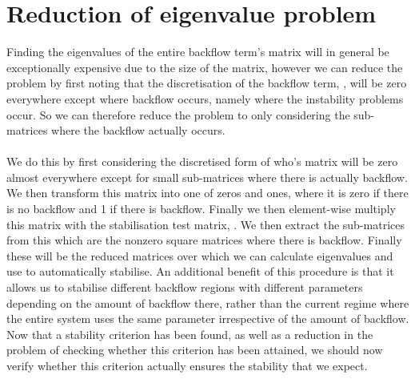 \section{Reduction of eigenvalue problem}

Finding the eigenvalues of the entire backflow term's matrix will in general be exceptionally expensive due to the size of the matrix, however we can reduce the problem by first noting that the discretisation of the backflow term, , will be zero everywhere except where backflow occurs, namely where the instability problems occur. So we can therefore reduce the problem to only considering the sub-matrices where the backflow actually occurs.\\
\\
We do this by first considering the discretised form of  who's matrix will be zero almost everywhere except for small sub-matrices where there is actually backflow. We then transform this matrix into one of zeros and ones, where it is zero if there is no backflow and 1 if there is backflow. Finally we then element-wise multiply this matrix with the stabilisation test matrix, . We then extract the sub-matrices from this which are the nonzero square matrices where there is backflow. Finally these will be the reduced matrices over which we can calculate eigenvalues and use to automatically stabilise. An additional benefit of this procedure is that it allows us to stabilise different backflow regions with different parameters depending on the amount of backflow there, rather than the current regime where the entire system uses the same parameter irrespective of the amount of backflow. Now that a stability criterion has been found, as well as a reduction in the problem of checking whether this criterion has been attained, we should now verify whether this criterion actually ensures the stability that we expect.

